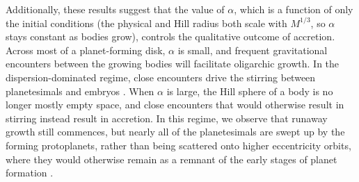 \documentclass[twocolumn]{aastex63}
\begin{document}
Additionally, these results suggest that the value of $\alpha$, which is a function of only the initial conditions (the physical and 
Hill radius both scale with $M^{1/3}$, so $\alpha$ stays constant as bodies grow), controls the qualitative outcome of accretion. 
Across most of a planet-forming disk, $\alpha$ is small, and frequent gravitational encounters between the growing bodies will 
facilitate oligarchic growth. In the dispersion-dominated regime, close encounters drive the stirring between planetesimals and 
embryos \citep{weidenschilling89, ida90}. When $\alpha$ is large, the Hill sphere of a body is no longer mostly empty space, 
and close encounters that would otherwise result in stirring instead result in accretion. In this regime, we observe that runaway 
growth still commences, but nearly all of the planetesimals are swept up by the forming protoplanets, rather than being scattered 
onto higher eccentricity orbits, where they would otherwise remain as a remnant of the early stages of planet formation 
\citep{kokubo98, kokubo00}.




\end{document}
